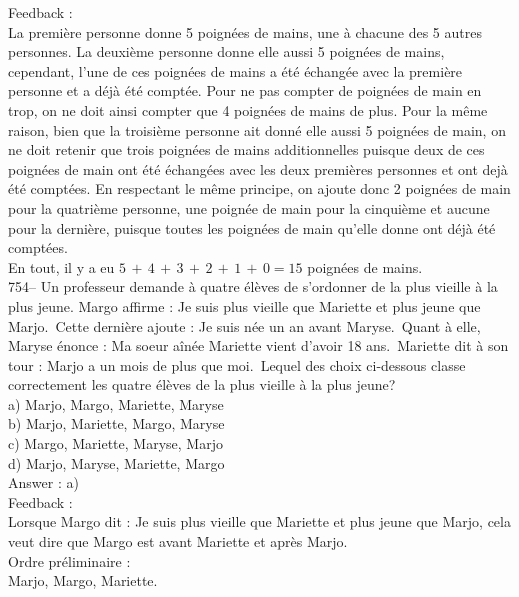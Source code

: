 ﻿\documentclass[letterpaper, 12pt]{article}
\begin{document}
Feedback : \\
La premi\`ere personne donne 5 poign\'ees de mains, une \`a chacune
des 5 autres personnes. La deuxi\`eme personne donne elle aussi 5
poign\'ees de mains, cependant, l'une de ces poign\'ees de mains a
\'et\'e \'echang\'ee avec la premi\`ere personne et a d\'ej\`a
\'et\'e compt\'ee. Pour ne pas compter de poign\'ees de main en
trop, on ne doit ainsi compter que 4 poign\'ees de mains de plus.
Pour la m\^eme raison, bien que la troisi\`eme personne ait donn\'e
elle aussi 5 poign\'ees de main, on ne doit retenir que trois
poign\'ees de mains additionnelles puisque deux de ces poign\'ees de
main ont \'et\'e \'echang\'ees avec les deux premi\`eres personnes
et ont dej\`a \'et\'e compt\'ees. En respectant le m\^eme principe,
on ajoute donc 2 poign\'ees de main pour la quatri\`eme personne,
une poign\'ee de main pour la cinqui\`eme et aucune pour la
derni\`ere, puisque toutes les poign\'ees de main qu'elle donne ont
d\'ej\`a
\'et\'e compt\'ees.\\
En tout, il y a eu $5\,+\,4\,+\,3\,+\,2\,+\,1\,+\,0=15$ poign\'ees de
mains.\\

754-- Un professeur demande \`a quatre \'el\`eves de s'ordonner de
la plus vieille \`a la plus jeune.  Margo affirme : \og Je suis plus
vieille que Mariette et plus jeune que Marjo.\fg\  Cette derni\`ere
ajoute : \og Je suis n\'ee un an avant Maryse.\fg\  Quant \`a elle,
Maryse \'enonce : \og Ma soeur a\^in\'ee Mariette vient d'avoir 18
ans.\fg\ Mariette dit \`a son tour : \og Marjo a un mois de plus que
moi.\fg\ Lequel des choix ci-dessous classe correctement les
quatre \'el\`eves de la plus vieille \`a la plus jeune?\\
a) Marjo, Margo, Mariette, Maryse\\
b) Marjo, Mariette, Margo, Maryse\\
c) Margo, Mariette, Maryse, Marjo\\
d) Marjo, Maryse, Mariette, Margo\\

Answer : a)\\

Feedback : \\
Lorsque Margo dit : \og Je suis plus vieille que Mariette et plus
jeune que Marjo\fg , cela veut dire que Margo est avant Mariette et
apr\`es Marjo.\\

Ordre pr\'eliminaire :\\
Marjo, Margo, Mariette.\\
\end{document}
